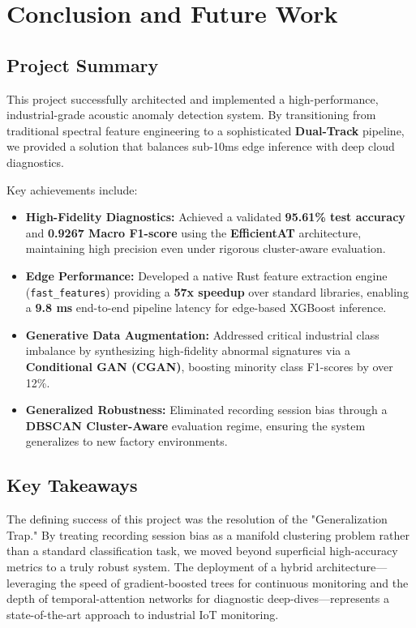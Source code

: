 \chapter{Conclusion and Future Work}

\section{Project Summary}
This project successfully architected and implemented a high-performance, industrial-grade acoustic anomaly detection system. By transitioning from traditional spectral feature engineering to a sophisticated \textbf{Dual-Track} pipeline, we provided a solution that balances sub-10ms edge inference with deep cloud diagnostics.

Key achievements include:
\begin{itemize}
    \item \textbf{High-Fidelity Diagnostics:} Achieved a validated \textbf{95.61\% test accuracy} and \textbf{0.9267 Macro F1-score} using the \textbf{EfficientAT} architecture, maintaining high precision even under rigorous cluster-aware evaluation.
    \item \textbf{Edge Performance:} Developed a native Rust feature extraction engine (\texttt{fast\_features}) providing a \textbf{57x speedup} over standard libraries, enabling a \textbf{9.8 ms} end-to-end pipeline latency for edge-based XGBoost inference.
    \item \textbf{Generative Data Augmentation:} Addressed critical industrial class imbalance by synthesizing high-fidelity abnormal signatures via a \textbf{Conditional GAN (CGAN)}, boosting minority class F1-scores by over 12\%.
    \item \textbf{Generalized Robustness:} Eliminated recording session bias through a \textbf{DBSCAN Cluster-Aware} evaluation regime, ensuring the system generalizes to new factory environments.
\end{itemize}

\section{Key Takeaways}
The defining success of this project was the resolution of the "Generalization Trap." By treating recording session bias as a manifold clustering problem rather than a standard classification task, we moved beyond superficial high-accuracy metrics to a truly robust system. The deployment of a hybrid architecture—leveraging the speed of gradient-boosted trees for continuous monitoring and the depth of temporal-attention networks for diagnostic deep-dives—represents a state-of-the-art approach to industrial IoT monitoring.

